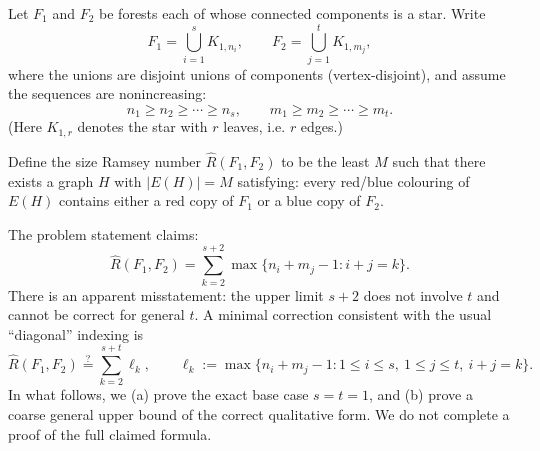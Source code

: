 Let $F_1$ and $F_2$ be forests each of whose connected components is a star.
Write
\[
F_1=\bigcup_{i=1}^s K_{1,n_i},\qquad F_2=\bigcup_{j=1}^t K_{1,m_j},
\]
where the unions are disjoint unions of components (vertex-disjoint), and assume the sequences are nonincreasing:
\[
n_1\ge n_2\ge \cdots \ge n_s,\qquad m_1\ge m_2\ge \cdots \ge m_t.
\]
(Here $K_{1,r}$ denotes the star with $r$ leaves, i.e. $r$ edges.)

Define the size Ramsey number $\hat R(F_1,F_2)$ to be the least $M$ such that there exists a graph $H$ with $|E(H)|=M$ satisfying: every red/blue colouring of $E(H)$ contains either a red copy of $F_1$ or a blue copy of $F_2$.

The problem statement claims:
\[
\hat{R}(F_1,F_2)=\sum_{k=2}^{s+2} \max\{n_i+m_j-1: i+j=k\}.
\]
There is an apparent misstatement: the upper limit $s+2$ does not involve $t$ and cannot be correct for general $t$.
A minimal correction consistent with the usual ``diagonal'' indexing is
\[
\hat{R}(F_1,F_2)\stackrel{?}{=}\sum_{k=2}^{s+t} \ell_k,\qquad
\ell_k:= \max\{n_i+m_j-1: 1\le i\le s,\ 1\le j\le t,\ i+j=k\}.
\]
In what follows, we (a) prove the exact base case $s=t=1$, and (b) prove a coarse general upper bound of the correct qualitative form.
We do not complete a proof of the full claimed formula.
